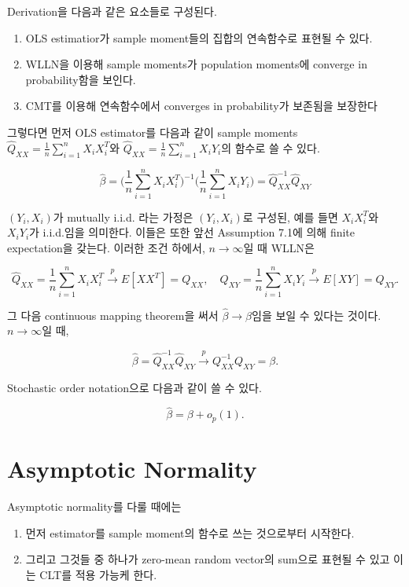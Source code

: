 \documentclass[
  letterpaper,
  DIV=11,
  numbers=noendperiod]{scrreprt}
\providecommand{\tightlist}{%
  \setlength{\itemsep}{0pt}\setlength{\parskip}{0pt}}\usepackage{longtable,booktabs,array}
\theoremstyle{definition}
\theoremstyle{plain}
\theoremstyle{remark}
\begin{document}
Derivation을 다음과 같은 요소들로 구성된다.

\begin{enumerate}
\def\labelenumi{\arabic{enumi}.}
\tightlist
\item
  OLS estimatior가 sample moment들의 집합의 연속함수로 표현될 수 있다.
\item
  WLLN을 이용해 sample moments가 population moments에 converge in
  probability함을 보인다.
\item
  CMT를 이용해 연속함수에서 converges in probability가 보존됨을 보장한다
\end{enumerate}

그렇다면 먼저 OLS estimator를 다음과 같이 sample moments
\(\hat{Q}_{XX}=\frac{1}{n}\sum_{i=1}^{n} X_i X_i^{T}\)와
\(\hat{Q}_{XX}=\frac{1}{n}\sum_{i=1}^{n} X_i Y_i\)의 함수로 쓸 수 있다.

\[
\hat{\beta} = \Big(\frac{1}{n}\sum_{i=1}^n X_i X_i^T \Big)^{-1} \Big(\frac{1}{n}\sum_{i=1}^n X_i Y_i \Big) = \hat{Q}_{XX}^{-1}\hat{Q}_{XY}
\]

\((Y_i, X_i)\)가 mutually i.i.d. 라는 가정은 \((Y_i, X_i)\)로 구성된,
예를 들면 \(X_i X_i^{T}\)와 \(X_i Y_i\)가 i.i.d.임을 의미한다. 이들은
또한 앞선 Assumption 7.1에 의해 finite expectation을 갖는다. 이러한 조건
하에서, \(n\rightarrow \infty\)일 때 WLLN은

\[
\hat{Q}_{XX} = \frac{1}{n}\sum_{i=1}^n X_i X_i^{T} \stackrel{p}{\rightarrow} E[XX^T] = Q_{XX}, \quad{} \hat{Q}_{XY} = \frac{1}{n}\sum_{i=1}^n X_i Y_i\stackrel{p}{\rightarrow} E[XY] = Q_{XY}.
\]

그 다음 continuous mapping theorem을 써서
\(\hat{\beta} \rightarrow \beta\)임을 보일 수 있다는 것이다.
\(n\rightarrow \infty\)일 때,

\[
\hat{\beta} = \hat{Q}_{XX} ^{-1}\hat{Q}_{XY} \stackrel{p}{\rightarrow}Q_{XX}^{-1}Q_{XY} = \beta.
\]

Stochastic order notation으로 다음과 같이 쓸 수 있다.

\[
\hat{\beta} = \beta + o_p (1).
\]

\section{Asymptotic Normality}\label{asymptotic-normality}

Asymptotic normality를 다룰 때에는

\begin{enumerate}
\def\labelenumi{\arabic{enumi}.}
\tightlist
\item
  먼저 estimator를 sample moment의 함수로 쓰는 것으로부터 시작한다.
\item
  그리고 그것들 중 하나가 zero-mean random vector의 sum으로 표현될 수
  있고 이는 CLT를 적용 가능케 한다.
\end{enumerate}
\end{document}
